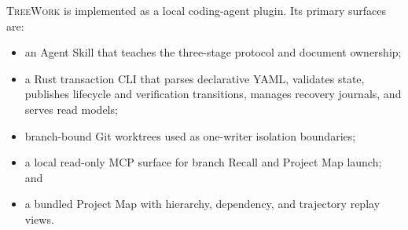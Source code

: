 \documentclass[11pt]{article}
\newcommand{\system}{\textsc{TreeWork}\xspace}
\theoremstyle{definition}
\begin{document}
\system is implemented as a local coding-agent plugin.  Its primary surfaces
are:

\begin{itemize}
  \item an Agent Skill that teaches the three-stage protocol and document
        ownership;
  \item a Rust transaction CLI that parses declarative YAML, validates state,
        publishes lifecycle and verification transitions, manages recovery
        journals, and serves read models;
  \item branch-bound Git worktrees used as one-writer isolation boundaries;
  \item a local read-only MCP surface for branch Recall and Project Map launch;
        and
  \item a bundled Project Map with hierarchy, dependency, and trajectory replay
        views.
\end{itemize}
\end{document}
